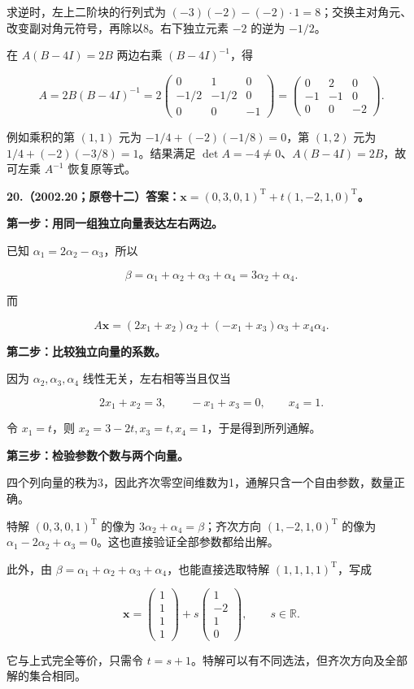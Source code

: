 \documentclass[UTF8,11pt,fontset=windows]{ctexart}
\begin{document}
求逆时，左上二阶块的行列式为 $(-3)(-2)-(-2)\cdot1=8$；交换主对角元、改变副对角元符号，再除以8。右下独立元素 $-2$ 的逆为 $-1/2$。

在 $A(B-4I)=2B$ 两边右乘 $(B-4I)^{-1}$，得

$$
A=2B(B-4I)^{-1}
=2\begin{pmatrix}0&1&0\\-1/2&-1/2&0\\0&0&-1\end{pmatrix}
=\boxed{\begin{pmatrix}0&2&0\\-1&-1&0\\0&0&-2\end{pmatrix}}.
$$

例如乘积的第 $(1,1)$ 元为 $-1/4+(-2)(-1/8)=0$，第 $(1,2)$ 元为 $1/4+(-2)(-3/8)=1$。结果满足 $\det A=-4\ne0$、$A(B-4I)=2B$，故可左乘 $A^{-1}$ 恢复原等式。

\clearpage

\textbf{20.（2002.20；原卷十二）答案：$\boldsymbol x=(0,3,0,1)^{\mathrm T}+t(1,-2,1,0)^{\mathrm T}$。}

\textbf{第一步：用同一组独立向量表达左右两边。}

已知 $\alpha_1=2\alpha_2-\alpha_3$，所以

$$
\beta=\alpha_1+\alpha_2+\alpha_3+\alpha_4
=3\alpha_2+\alpha_4.
$$

而

$$
A\boldsymbol x
=(2x_1+x_2)\alpha_2+(-x_1+x_3)\alpha_3+x_4\alpha_4.
$$

\textbf{第二步：比较独立向量的系数。}

因为 $\alpha_2,\alpha_3,\alpha_4$ 线性无关，左右相等当且仅当

$$
2x_1+x_2=3,\qquad -x_1+x_3=0,\qquad x_4=1.
$$

令 $x_1=t$，则 $x_2=3-2t,x_3=t,x_4=1$，于是得到所列通解。

\textbf{第三步：检验参数个数与两个向量。}

四个列向量的秩为3，因此齐次零空间维数为1，通解只含一个自由参数，数量正确。

特解 $(0,3,0,1)^{\mathrm T}$ 的像为 $3\alpha_2+\alpha_4=\beta$；齐次方向 $(1,-2,1,0)^{\mathrm T}$ 的像为 $\alpha_1-2\alpha_2+\alpha_3=0$。这也直接验证全部参数都给出解。

此外，由 $\beta=\alpha_1+\alpha_2+\alpha_3+\alpha_4$，也能直接选取特解 $(1,1,1,1)^{\mathrm T}$，写成

$$
\boldsymbol x=\begin{pmatrix}1\\1\\1\\1\end{pmatrix}
+s\begin{pmatrix}1\\-2\\1\\0\end{pmatrix},\qquad s\in\mathbb R.
$$

它与上式完全等价，只需令 $t=s+1$。特解可以有不同选法，但齐次方向及全部解的集合相同。
\end{document}

